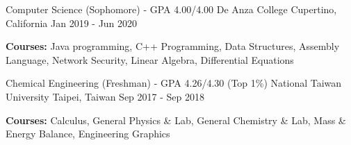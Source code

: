

\begin{cventries}

  \cventry
    {Computer Science (Sophomore) - GPA 4.00/4.00} %
    {De Anza College} %
    {Cupertino, California} %
    {Jan 2019 - Jun 2020} %
    {
		\vspace{-5.0mm}
		\item {\textbf{Courses:} Java programming, C++ Programming, Data Structures, Assembly Language, Network Security, Linear Algebra, Differential Equations}
	}

  \cventry
    {Chemical Engineering (Freshman) - GPA 4.26/4.30 (Top 1\%)} %
    {National Taiwan University} %
    {Taipei, Taiwan} %
    {Sep 2017 - Sep 2018} %
    {
		\vspace{-5.0mm}
		\item {\textbf{Courses:} Calculus, General Physics \& Lab, General Chemistry \& Lab, Mass \& Energy Balance, Engineering Graphics}
	}

\end{cventries}
